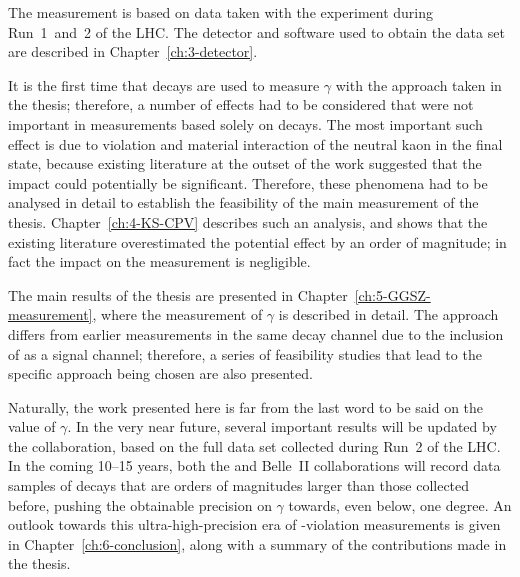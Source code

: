 The measurement is based on data taken with the \lhcb experiment during Run~1~and~2 of the LHC. The detector and software used to obtain the data set are described in Chapter~\ref{ch:3-detector}.

It is the first time that \BtoDpi decays are used to measure $\gamma$ with the approach taken in the thesis; therefore, a number of effects had to be considered that were not important in measurements based solely on \BtoDK decays. The most important such effect is due to \CP violation and material interaction of the neutral kaon in the final state, because existing literature at the outset of the work suggested that the impact could potentially be significant. Therefore, these phenomena had to be analysed in detail to establish the feasibility of the main measurement of the thesis. Chapter~\ref{ch:4-KS-CPV} describes such an analysis, and shows that the existing literature overestimated the potential effect by an order of magnitude; in fact the impact on the measurement is negligible.

The main results of the thesis are presented in Chapter~\ref{ch:5-GGSZ-measurement}, where the measurement of $\gamma$ is described in detail. The approach differs from earlier measurements in the same decay channel due to the inclusion of \BtoDpi as a signal channel; therefore, a series of feasibility studies that lead to the specific approach being chosen are also presented.


Naturally, the work presented here is far from the last word to be said on the value of $\gamma$. In the very near future, several important results will be updated by the \lhcb collaboration, based on the full data set collected during Run~2 of the LHC. In the coming 10--15 years, both the \lhcb and Belle~II collaborations will record data samples of \B decays that are orders of magnitudes larger than those collected before, pushing the obtainable precision on $\gamma$ towards, even below, one degree. An outlook towards this ultra-high-precision era of \CP-violation measurements is given in Chapter~\ref{ch:6-conclusion}, along with a summary of the contributions made in the thesis.



